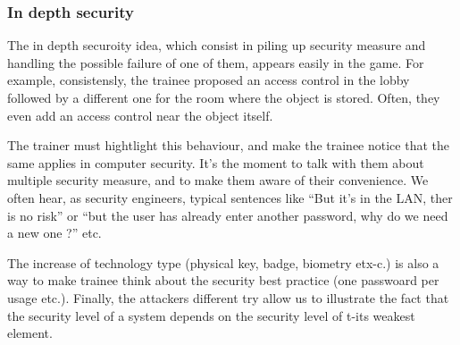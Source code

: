 \documentclass[11pt]{article} %
\begin{document}

\subsubsection{In depth security}
The in depth securoity idea, which consist in piling up security measure and 
handling the possible failure of one of them, appears easily in the game. 
For example, consistensly, the trainee proposed an access control in the lobby
followed by a different one for the room where the object is stored. Often, they 
even add an access control near the object itself.

The trainer must hightlight this behaviour, and make the trainee notice that the 
same applies in computer security. It's the moment to talk with them about multiple 
security measure, and to make them aware of their convenience. We often hear, 
as security engineers, typical sentences like ``But it's in the LAN, ther is no risk'' or 
``but the user has already enter another password, why do we need a new one ?'' etc.

The increase of technology type (physical key, badge, biometry etx-c.) is also a way 
to make trainee think about the security best practice (one passwoard per usage etc.).
Finally, the attackers different try allow us to illustrate the fact that the security level
of a system depends on the security level of t-its weakest element.
\end{document}
